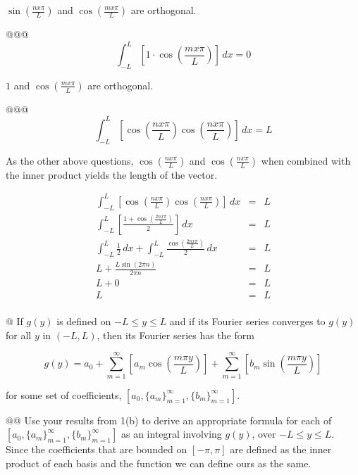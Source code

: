 \documentclass[10pt]{article}
\begin{document}
\begin{easylist}[enumerate]
    $\sin\left(\frac{nx\pi}{L}\right)$ and $\cos\left(\frac{mx\pi}{L}\right)$ are orthogonal.

    @@@ \[ \int_{-L}^L \left[ 1 \cdot \cos\left(\frac{mx\pi}{L}\right) \right] \, dx = 0 \]

    $1$ and $\cos\left(\frac{mx\pi}{L}\right)$ are orthogonal.

    @@@ \[ \int_{-L}^L \left[ \cos\left(\frac{nx\pi}{L}\right) \cos\left(\frac{nx\pi}{L}\right) \right] \, dx = L \]

    As the other above questions, $\cos\left(\frac{nx\pi}{L}\right)$ and $\cos\left(\frac{nx\pi}{L}\right)$ when
    combined with the inner product yields the length of the vector.

    \begin{align*}
        \int_{-L}^L \left[ \cos\left(\frac{nx\pi}{L}\right) \cos\left(\frac{nx\pi}{L}\right) \right] \, dx &=& L\\
        \int_{-L}^L \left[ \frac{1 + \cos\left(\frac{2nx\pi}{L}\right) }{2} \right] \, dx &=& L\\
        \int_{-L}^L \frac{1}{2} \, dx + \int_{-L}^L \frac{\cos\left(\frac{2nx\pi}{L}\right)}{2} \, dx &=& L\\
        L + \frac{L \sin (2 \pi  n)}{2 \pi  n} &=& L\\
        L + 0 &=& L\\
        L &=& L\\
    \end{align*}

    \newpage
    @ If $g(y)$ is defined on $-L \le y \le L$ and if its Fourier series converges to $g(y)$ for all $y$ in $(-L, L)$,
    then its Fourier series has the form

    \[
        g(y) = a_0 + \sum_{m=1}^\infty \left[ a_m \cos \left( \frac{m \pi y}{L} \right) \right] +
            \sum_{m=1}^\infty \left[ b_m \sin \left( \frac{m \pi y}{L} \right) \right]
    \]

    for some set of coefficients, $[a_0, {\{a_m\}}_{m=1}^\infty, {\{b_m\}}_{m=1}^\infty]$.

    @@ Use your results from 1(b) to derive an appropriate formula for each of $[a_0, {\{a_m\}}_{m=1}^\infty,
    {\{b_m\}}_{m=1}^\infty]$ as an integral involving $g(y)$, over $-L \le y \le L$.\\

    Since the coefficients that are bounded on $[-\pi, \pi]$ are defined as the inner product of each basis and the
    function we can define ours as the same.


\end{easylist}
\end{document}
